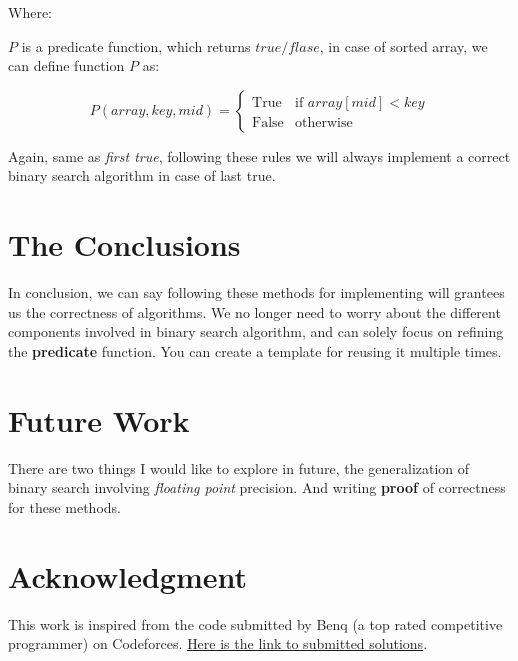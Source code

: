 \documentclass[10pt,twocolumn]{article}
\begin{document}
	\vspace{10pt}
	
	Where:
	
	\quad $P$ is a predicate function, which returns $true / flase$, in case of sorted array, we can define function $P$ as:
	
	\[
	P(array, key, mid) = 
	\begin{cases} 
		\text{True} & \text{if } array[mid] < key \\ 
		\text{False} & \text{otherwise} 
	\end{cases}
	\]
	\vspace{5pt}
	
	Again, same as \emph{first true}, following these rules we will always implement a correct binary search algorithm in case of last true.  
	
	\section{The Conclusions}
	
	In conclusion, we can say following these methods for implementing will grantees us the correctness of algorithms. We no longer need to worry about the different components involved in binary search algorithm, and can solely focus on refining the \textbf{predicate} function. You can create a template for reusing it multiple times.
	
	\section{Future Work}
	
	There are two things I would like to explore in future, the generalization of binary search involving \emph{floating point} precision. And writing \textbf{proof} of correctness for these methods. 
	
	\section{Acknowledgment}
	
	This work is inspired from the code submitted by Benq (a top rated competitive programmer) on Codeforces. \href{https://codeforces.com/submissions/Benq}{Here is the link to submitted solutions}.
	
\end{document}
